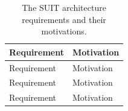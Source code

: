 \documentclass[0-thesis.tex]{subfiles}
\begin{document}
\begin{longtable}[]{@{}ll@{}}
    \caption{The SUIT architecture requirements and their motivations.}
    \label{tab:architecture-evaluation}\\
    \toprule
    \begin{minipage}[b]{0.41\columnwidth}\raggedright\strut
    Requirement\strut
    \end{minipage} & \begin{minipage}[b]{0.53\columnwidth}\raggedright\strut
    Motivation\strut
    \end{minipage}\tabularnewline
    \midrule
    \endfirsthead
    \toprule
    \begin{minipage}[b]{0.41\columnwidth}\raggedright\strut
    Requirement\strut
    \end{minipage} & \begin{minipage}[b]{0.53\columnwidth}\raggedright\strut
    Motivation\strut
    \end{minipage}\tabularnewline
    \midrule
    \endhead
    \toprule
    \begin{minipage}[b]{0.41\columnwidth}\raggedright\strut
    Requirement\strut
    \end{minipage} & \begin{minipage}[b]{0.53\columnwidth}\raggedright\strut
    Motivation\strut
    \end{minipage}\tabularnewline
    \midrule
    \endhead
    \toprule
    \begin{minipage}[b]{0.41\columnwidth}\raggedright\strut
    Requirement\strut
    \end{minipage} & \begin{minipage}[b]{0.53\columnwidth}\raggedright\strut
    Motivation\strut
    \end{minipage}\tabularnewline
    \midrule
    \endhead


\end{longtable}
\end{document}
